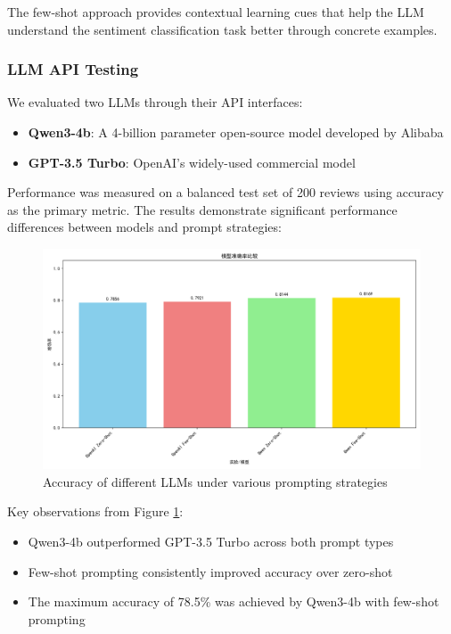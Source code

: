 \documentclass{article}
\begin{document}
The few-shot approach provides contextual learning cues that help the LLM understand the sentiment classification task better through concrete examples.

\subsubsection{LLM API Testing}
\label{sssec:llm_api}

We evaluated two LLMs through their API interfaces:
\begin{itemize}
    \item \textbf{Qwen3-4b}: A 4-billion parameter open-source model developed by Alibaba
    \item \textbf{GPT-3.5 Turbo}: OpenAI's widely-used commercial model
\end{itemize}

Performance was measured on a balanced test set of 200 reviews using accuracy as the primary metric. The results demonstrate significant performance differences between models and prompt strategies:

\begin{figure}[h]
    \centering
    \includegraphics[width=1\columnwidth]{pic/T2P2.c.acc.png}
    \caption{Accuracy of different LLMs under various prompting strategies}
    \label{fig:llm_accuracy}
\end{figure}

Key observations from Figure \ref{fig:llm_accuracy}:
\begin{itemize}
    \item Qwen3-4b outperformed GPT-3.5 Turbo across both prompt types
    \item Few-shot prompting consistently improved accuracy over zero-shot
    \item The maximum accuracy of 78.5\% was achieved by Qwen3-4b with few-shot prompting
\end{itemize}
\end{document}
